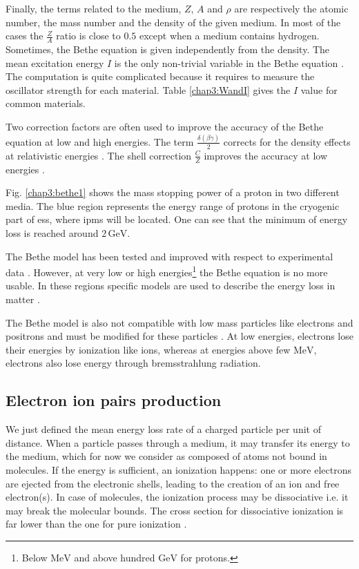 \begin{refsection}
  Finally, the terms related to the medium, \(Z\), \(A\) and \(\rho\) are respectively the atomic number, the mass number and the density of the given medium. In most of the cases the \(\frac{Z}{A}\) ratio is close to \(0.5\) except when a medium contains hydrogen. Sometimes, the Bethe equation is given independently from the density.
  The mean excitation energy \(I\) is the only non-trivial variable in the Bethe equation \cite{Berger1984,Berger1993}. The computation is quite complicated because it requires to measure the oscillator strength for each material. Table \ref{chap3:WandI} gives the \(I\) value for common materials.

  Two correction factors are often used to improve the accuracy of the Bethe equation at low and high energies. The term \(\frac{\delta(\beta \gamma)}{2}\) corrects for the density effects at relativistic energies \cite{Sternheimer1984}. The shell correction \(\frac{C}{Z}\) improves the accuracy at low energies \cite{Bichsel2002}.

  

  Fig. \ref{chap3:bethe1} shows the mass stopping power of a proton in two different media. The blue region represents the energy range of protons in the cryogenic part of \acrshort{ess}, where \acrshort{ipm}s will be located. One can see that the minimum of energy loss is reached around \(2\,\mathrm{GeV}\).

  The Bethe model has been tested and improved with respect to experimental data \cite{Porter1990}. However, at very low or high energies\footnote{Below $\mathrm{MeV}$ and above hundred $\mathrm{GeV}$ for protons.} the Bethe equation is no more usable. In these regions specific models are used to describe the energy loss in matter \cite{Ziegler1985, Allison1980}.

  The Bethe model is also not compatible with low mass particles like electrons and positrons and must be modified for these particles \cite{Rieke1972}\cite[p. 452]{Tanabashi2018}. At low energies, electrons lose their energies by ionization like ions, whereas at energies above few \(\mathrm{MeV}\), electrons also lose energy through bremsstrahlung radiation.

  \subsection{Electron ion pairs production}
  We just defined the mean energy loss rate of a charged particle per unit of distance. When a particle passes through a medium, it may transfer its energy to the medium, which for now we consider as composed of atoms not bound in molecules. If the energy is sufficient, an ionization happens: one or more electrons are ejected from the electronic shells, leading to the creation of an ion and free electron(s). In case of molecules, the ionization process may be dissociative i.e. it may break the molecular bounds. The cross section for dissociative ionization is far lower than the one for pure ionization \cite{Dimopoulou2004}.


\end{refsection}
